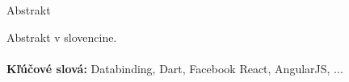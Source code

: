 \documentclass[oneside, 12pt]{book}
\def\mfkeywordssk{Databinding, Dart, Facebook React, AngularJS, ... }      %
\begin{document}
\noindent
\begin{center}
\begin{minipage}{1\textwidth}
\centerline{\large Abstrakt}
Abstrakt v slovencine.
\\ \\ 
{\bf Kľúčové slová:} \mfkeywordssk
\end{minipage}
\end{center}
\eject %



%

\tableofcontents

\listoffigures

\mainmatter

\pagestyle{plain}

\newcommand{\tiles}[0]{\textbf{\texttt{Tiles}} }
\newcommand{\react}[0]{\textit{React} }
\newcommand{\facebook}[0]{Facebook }
\end{document}

